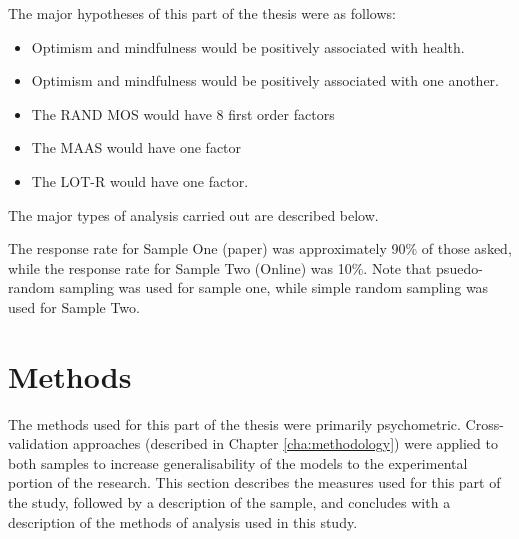 \documentclass{article}
\begin{document}
The major hypotheses of this part of the thesis were as follows:
\begin{itemize}
\item Optimism and mindfulness would be positively associated with health.

\item Optimism and mindfulness would be positively associated with one another. 

\item The RAND MOS would have 8 first order factors%

\item The MAAS would have one factor

\item The LOT-R would have one factor.
\end{itemize}

The major types of analysis carried out are described below. 

The response rate for Sample One (paper) was approximately
90\% of those asked, while the response rate for Sample Two (Online)
was 10\%. Note that psuedo-random sampling was used for sample one, while simple random sampling was used for Sample Two. 

\section{Methods}
\label{sec:methods}

The methods used for this part of the thesis were primarily psychometric. Cross-validation approaches (described in Chapter \ref{cha:methodology}) were applied to both samples to increase generalisability of the models to the experimental portion of the research. This section describes the measures used for this part of the study, followed by a description of the sample, and concludes with a description of the methods of analysis used in this study. 
\end{document}
